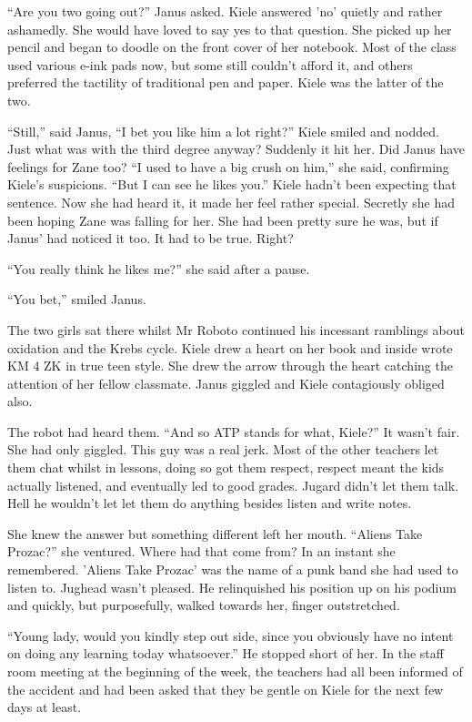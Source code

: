 ``Are you two going out?'' Janus asked.  Kiele answered 'no' quietly and rather ashamedly.  She would have loved to say yes to that question.  She picked up her pencil and began to doodle on the front cover of her notebook.  Most of the class used various e-ink pads now, but some still couldn't afford it, and others preferred the tactility of traditional pen and paper.  Kiele was the latter of the two.  

``Still,'' said Janus, ``I bet you like him a lot right?''  Kiele smiled and nodded.  Just what was with the third degree anyway?  Suddenly it hit her.  Did Janus have feelings for Zane too?  ``I used to have a big crush on him,'' she said, confirming Kiele's suspicions.  ``But I can see he likes you.''  Kiele hadn't been expecting that sentence.  Now she had heard it, it made her feel rather special.  Secretly she had been hoping Zane was falling for her.  She had been pretty sure he was, but if Janus' had noticed it too.  It had to be true.  Right?

``You really think he likes me?'' she said after a pause.

``You bet,'' smiled Janus.  

The two girls sat there whilst Mr Roboto continued his incessant ramblings about oxidation and the Krebs cycle.  Kiele drew a heart on her book and inside wrote KM 4 ZK in true teen style.  She drew the arrow through the heart catching the attention of her fellow classmate.  Janus giggled and Kiele contagiously obliged also.

The robot had heard them.  ``And so ATP stands for what, Kiele?''  It wasn't fair.  She had only giggled.  This guy was a real jerk.  Most of the other teachers let them chat whilst in lessons, doing so got them respect, respect meant the kids actually listened, and eventually led to good grades.  Jugard didn't let them talk.  Hell he wouldn't let let them do anything besides listen and write notes.

She knew the answer but something different left her mouth.  ``Aliens Take Prozac?'' she ventured.  Where had that come from?  In an instant she remembered.  'Aliens Take Prozac' was the name of a punk band she had used to listen to.  Jughead wasn't pleased.  He relinquished his position up on his podium and quickly, but purposefully, walked towards her, finger outstretched.  

``Young lady, would you kindly step out side, since you obviously have no intent on doing any learning today whatsoever.''  He stopped short of her.  In the staff room meeting at the beginning of the week, the teachers had all been informed of the accident and had been asked that they be gentle on Kiele for the next few days at least.

